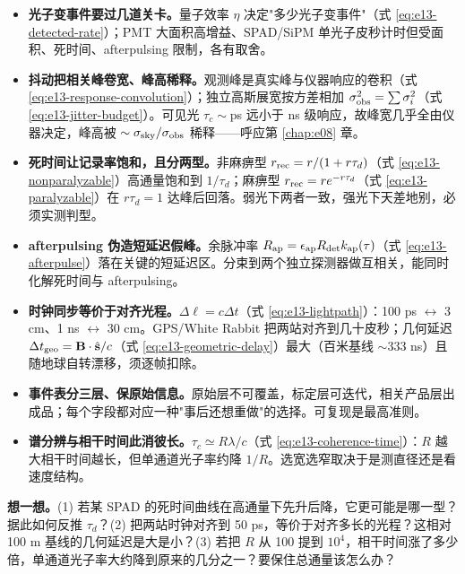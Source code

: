 \begin{itemize}
  \item \textbf{光子变事件要过几道关卡。}量子效率 \(\eta\) 决定"多少光子变事件"（式 \eqref{eq:e13-detected-rate}）；PMT 大面积高增益、SPAD/SiPM 单光子皮秒计时但受面积、死时间、afterpulsing 限制，各有取舍。
  \item \textbf{抖动把相关峰卷宽、峰高稀释。}观测峰是真实峰与仪器响应的卷积（式 \eqref{eq:e13-response-convolution}）；独立高斯展宽按方差相加 \(\sigma_{\rm obs}^2=\sum\sigma_i^2\)（式 \eqref{eq:e13-jitter-budget}）。可见光 \(\tau_c\sim\)ps 远小于 ns 级响应，故峰宽几乎全由仪器决定，峰高被 \(\sim\sigma_{\rm sky}/\sigma_{\rm obs}\) 稀释——呼应第 \ref{chap:e08} 章。
  \item \textbf{死时间让记录率饱和，且分两型。}非麻痹型 \(r_{\rm rec}=r/(1+r\tau_d)\)（式 \eqref{eq:e13-nonparalyzable}）高通量饱和到 \(1/\tau_d\)；麻痹型 \(r_{\rm rec}=re^{-r\tau_d}\)（式 \eqref{eq:e13-paralyzable}）在 \(r\tau_d=1\) 达峰后回落。弱光下两者一致，强光下天差地别，必须实测判型。
  \item \textbf{afterpulsing 伪造短延迟假峰。}余脉冲率 \(R_{\rm ap}=\epsilon_{\rm ap}R_{\rm det}k_{\rm ap}(\tau)\)（式 \eqref{eq:e13-afterpulse}）落在关键的短延迟区。分束到两个独立探测器做互相关，能同时化解死时间与 afterpulsing。
  \item \textbf{时钟同步等价于对齐光程。}\(\Delta\ell=c\Delta t\)（式 \eqref{eq:e13-lightpath}）：100 ps \(\leftrightarrow\) 3 cm、1 ns \(\leftrightarrow\) 30 cm。GPS/White Rabbit 把两站对齐到几十皮秒；几何延迟 \(\Delta t_{\rm geo}=\mathbf B\cdot\hat{\mathbf s}/c\)（式 \eqref{eq:e13-geometric-delay}）最大（百米基线 \(\sim\)333 ns）且随地球自转漂移，须逐帧扣除。
  \item \textbf{事件表分三层、保原始信息。}原始层不可覆盖，标定层可迭代，相关产品层出成品；每个字段都对应一种"事后还想重做"的选择。可复现是最高准则。
  \item \textbf{谱分辨与相干时间此消彼长。}\(\tau_c\simeq R\lambda/c\)（式 \eqref{eq:e13-coherence-time}）：\(R\) 越大相干时间越长，但单通道光子率约降 \(1/R\)。选宽选窄取决于是测直径还是看速度结构。
\end{itemize}

\noindent\textbf{想一想。}(1) 若某 SPAD 的死时间曲线在高通量下先升后降，它更可能是哪一型？据此如何反推 \(\tau_d\)？(2) 把两站时钟对齐到 50 ps，等价于对齐多长的光程？这相对 100 m 基线的几何延迟是大是小？(3) 若把 \(R\) 从 100 提到 \(10^4\)，相干时间涨了多少倍，单通道光子率大约降到原来的几分之一？要保住总通量该怎么办？
